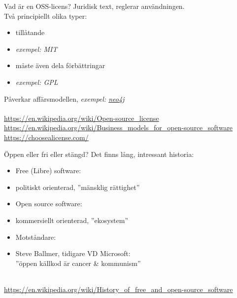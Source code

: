\documentclass{simpleslides}
\begin{document}
\begin{Slide}{Vad är en OSS-licens?}
Juridisk text, reglerar användningen.\\Två principiellt olika typer: 
  \begin{itemize}
    \item tillåtande \hfill {}
    \item [] \emph{exempel: MIT}
    \item måste även dela förbättringar \hfill {}
    \item [] \emph{exempel: GPL}
  \end{itemize}
  Påverkar affärsmodellen, \emph{exempel: \href{https://sv.wikipedia.org/wiki/Neo4j}{neo4j}}\\
{\fontsize{8}{8}\selectfont ~\\
\href{https://en.wikipedia.org/wiki/Open-source_license}{https://en.wikipedia.org/wiki/Open-source\_license} \\
\href{https://en.wikipedia.org/wiki/Business_models_for_open-source_software}{https://en.wikipedia.org/wiki/Business\_models\_for\_open-source\_software} \\
\href{https://choosealicense.com/}{https://choosealicense.com/}
}
\end{Slide}

\begin{Slide}{Öppen eller fri eller stängd?}
Det finns lång, intressant historia: 
  \begin{itemize}
    \item Free (Libre) software:
    \item[] politiskt orienterad, ''mänsklig rättighet'' 
    \item Open source software:
    \item[] kommersiellt orienterad, ''ekosystem''
    \item Motståndare:
    \item[] Steve Ballmer, tidigare VD Microsoft: \\ ''öppen källkod är cancer \& kommunism''  
  \end{itemize}
  {\fontsize{8}{10}\selectfont ~\\
\href{https://en.wikipedia.org/wiki/History_of_free_and_open-source_software}{https://en.wikipedia.org/wiki/History\_of\_free\_and\_open-source\_software} \\
}
\end{Slide}
\end{document}
